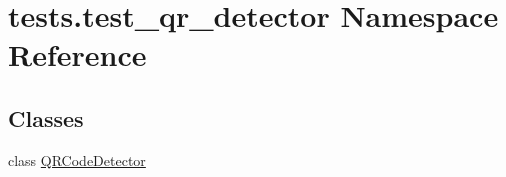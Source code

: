 \hypertarget{namespacetests_1_1test__qr__detector}{}\section{tests.\+test\+\_\+qr\+\_\+detector Namespace Reference}
\label{namespacetests_1_1test__qr__detector}
\subsection*{Classes}
\begin{DoxyCompactItemize}
\item 
class \hyperlink{classtests_1_1test__qr__detector_1_1QRCodeDetector}{Q\+R\+Code\+Detector}
\end{DoxyCompactItemize}
